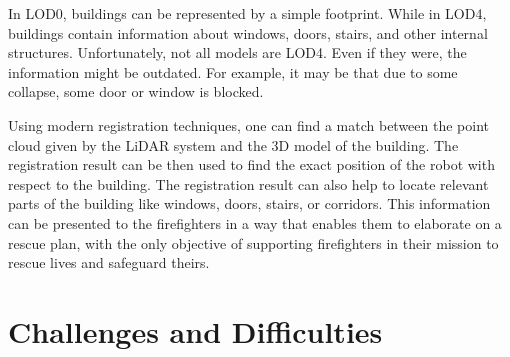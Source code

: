         In LOD0, buildings can be represented by a simple footprint. While in LOD4, buildings contain information about windows, doors, stairs, and other internal structures.
        Unfortunately, not all models are LOD4. Even if they were, the information might be outdated. For example, it may be that due to some collapse, some door or window is blocked.
        \par
        Using modern registration techniques, one can find a match between the point cloud given by the LiDAR system and the 3D model of the building.
        The registration result can be then used to find the exact position of the robot with respect to the building.
        The registration result can also help to locate relevant parts of the building like windows, doors, stairs, or corridors.
        This information can be presented to the firefighters in a way that enables them to elaborate on a rescue plan, with the only objective of 
        supporting firefighters in their mission to rescue lives and safeguard theirs.

    \section{Challenges and Difficulties}
    
